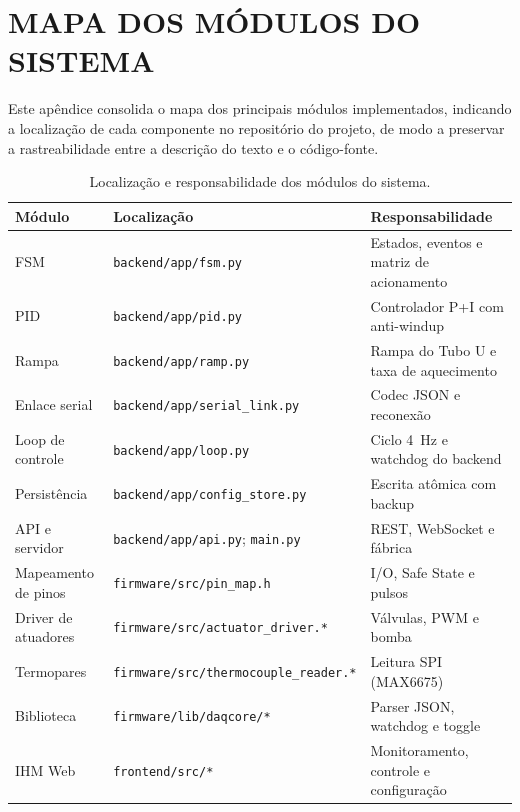 \chapter{MAPA DOS MÓDULOS DO SISTEMA}

Este apêndice consolida o mapa dos principais módulos implementados, indicando a
localização de cada componente no repositório do projeto, de modo a preservar a
rastreabilidade entre a descrição do texto e o código-fonte.

\begin{table}[htbp]
\centering
\caption{Localiza\c{c}\~ao e responsabilidade dos m\'odulos do sistema.}
\label{tab:mapa}
\footnotesize\setlength{\tabcolsep}{4pt}
\begin{tabular}{p{3.8cm}p{6.4cm}p{4.7cm}}
\toprule
\textbf{M\'odulo} & \textbf{Localiza\c{c}\~ao} & \textbf{Responsabilidade} \\
\midrule
FSM & \texttt{backend/app/fsm.py} & Estados, eventos e matriz de acionamento \\
PID & \texttt{backend/app/pid.py} & Controlador P+I com anti-windup \\
Rampa & \texttt{backend/app/ramp.py} & Rampa do Tubo U e taxa de aquecimento \\
Enlace serial & \texttt{backend/app/serial\_link.py} & Codec JSON e reconex\~ao \\
Loop de controle & \texttt{backend/app/loop.py} & Ciclo 4~Hz e watchdog do backend \\
Persist\^encia & \texttt{backend/app/config\_store.py} & Escrita at\^omica com backup \\
API e servidor & \texttt{backend/app/api.py}; \texttt{main.py} & REST, WebSocket e f\'abrica \\
Mapeamento de pinos & \texttt{firmware/src/pin\_map.h} & I/O, Safe State e pulsos \\
Driver de atuadores & \texttt{firmware/src/actuator\_driver.*} & V\'alvulas, PWM e bomba \\
Termopares & \texttt{firmware/src/thermocouple\_reader.*} & Leitura SPI (MAX6675) \\
Biblioteca \daq{} & \texttt{firmware/lib/daqcore/*} & Parser JSON, watchdog e toggle \\
IHM Web & \texttt{frontend/src/*} & Monitoramento, controle e configura\c{c}\~ao \\
\bottomrule
\end{tabular}
\par\vspace{2pt}{\footnotesize Fonte: elaborada pelo autor com base na estrutura do reposit\'orio do projeto.}
\end{table}

